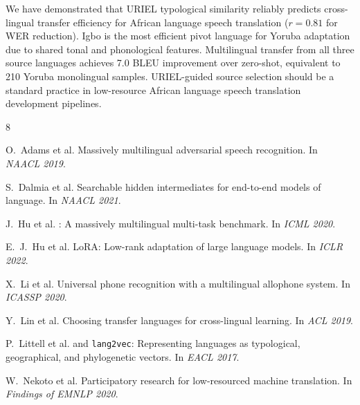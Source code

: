 \documentclass[11pt,a4paper]{article}
\begin{document}
We have demonstrated that URIEL typological similarity reliably predicts cross-lingual transfer efficiency for African language speech translation ($r = 0.81$ for WER reduction). Igbo is the most efficient pivot language for Yoruba adaptation due to shared tonal and phonological features. Multilingual transfer from all three source languages achieves 7.0 BLEU improvement over zero-shot, equivalent to 210 Yoruba monolingual samples. URIEL-guided source selection should be a standard practice in low-resource African language speech translation development pipelines.




\begin{thebibliography}{8}

O.~Adams et al.
\newblock Massively multilingual adversarial speech recognition.
\newblock In \emph{NAACL 2019}.

S.~Dalmia et al.
\newblock Searchable hidden intermediates for end-to-end models of language.
\newblock In \emph{NAACL 2021}.

J.~Hu et al.
: A massively multilingual multi-task benchmark.
\newblock In \emph{ICML 2020}.

E.~J.~Hu et al.
\newblock Lo{RA}: Low-rank adaptation of large language models.
\newblock In \emph{ICLR 2022}.

X.~Li et al.
\newblock Universal phone recognition with a multilingual allophone system.
\newblock In \emph{ICASSP 2020}.

Y.~Lin et al.
\newblock Choosing transfer languages for cross-lingual learning.
\newblock In \emph{ACL 2019}.

P.~Littell et al.
 and \texttt{lang2vec}: Representing languages as typological, geographical, and phylogenetic vectors.
\newblock In \emph{EACL 2017}.

W.~Nekoto et al.
\newblock Participatory research for low-resourced machine translation.
\newblock In \emph{Findings of EMNLP 2020}.

\end{thebibliography}
\end{document}
